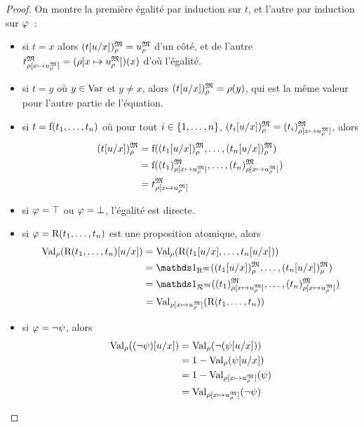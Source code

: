 \begin{proof}
  On montre la première égalité par induction sur $t$, et l'autre par induction
  sur $\varphi$~:
  \begin{itemize}
  \item si $t = x$ alors $(t[u/x])^{\mathfrak{M}}_{\rho} = u^{\mathfrak{M}}_{\rho}$ d'un côté,
    et de l'autre
    $t^{\mathfrak{M}}_{\rho[x\mapsto u^{\mathfrak{M}}_{\rho}]}=(\rho[x\mapsto u^{\mathfrak{M}}_{\rho}])(x)$
    d'où l'égalité.
  \item si $t = y$ où $y\in\operatorname{Var}$ et $y\neq x$, alors
    $(t[u/x])^{\mathfrak{M}}_{\rho} = \rho(y)$, qui est la même valeur pour l'autre
    partie de l'équation.
  \item si $t = \mathrm{f}(t_1,\ldots,t_n)$ où pour tout $i\in\{1,\ldots,n\}$,
    $(t_i[u/x])^{\mathfrak{M}}_{\rho}= (t_i)^{\mathfrak{M}}_{\rho[x\mapsto u^{\mathfrak{M}}_{\rho}]}$,
    alors
    \begin{align*}
      (t[u/x])^{\mathfrak{M}}_{\rho} &= \mathrm{f}((t_1[u/x])^{\mathfrak{M}}_{\rho},\ldots,
      (t_n[u/x])^{\mathfrak{M}}_{\rho})\\
      &= \mathrm{f}((t_1)^{\mathfrak{M}}_{\rho[x\mapsto u^{\mathfrak{M}}_{\rho}]},\ldots,
      (t_n)^{\mathfrak{M}}_{\rho[x\mapsto u^{\mathfrak{M}}_{\rho}]})\\
      &= t^{\mathfrak{M}}_{\rho[x\mapsto u^{\mathfrak{M}}_{\rho}]}
    \end{align*}
  \item si $\varphi = \top$ ou $\varphi = \bot$, l'égalité est directe.
  \item si $\varphi = \mathrm{R}(t_1,\ldots,t_n)$ est une proposition
    atomique, alors
    \begin{align*}
      \ValE(\symbR(t_1,\ldots,t_n)[u/x])
      &= \ValE(\symbR(t_1[u/x],\ldots,t_n[u/x]))\\
      &= \indicP{\toM{\symbR}}
      (\toMMI{(t_1[u/x])},\ldots,\toMMI{(t_n[u/x])})\\
      &= \indicP{\toM{\mathord{\varRR}}}
      (\toMIP{(t_1)}{\varMM}{\env[x\mapsto \toMMI{u}]},
      \ldots, \toMIP{(t_n)}{\varMM}{\env[x\mapsto \toMMI{u}]})\\
      &= \ValP{\env[x\mapsto \toMMI{u}]}(\symbR(t_1,\ldots,t_n))
    \end{align*}
  \item si $\varphi = \lnot \psi$, alors
    \begin{align*}
      \ValE((\lnot \varFP)[u/x]) &= \ValE(\lnot (\varFP[u/x]))\\
      &= 1 - \ValE(\varFP[u/x])\\
      &= 1 - \ValP{\env[x\mapsto \toMMI{u}]}(\varFP)\\
      &= \ValP{\env[x\mapsto \toMMI{u}]}(\lnot\varFP)\\

\end{align*}
\end{itemize}
\end{proof}
